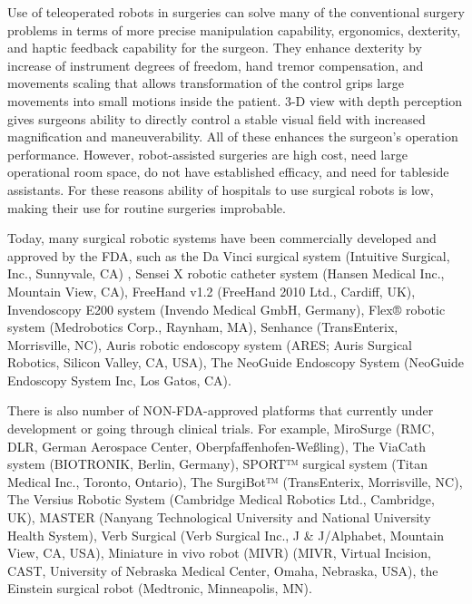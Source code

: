 Use of teleoperated robots in surgeries can solve many of the conventional surgery problems in terms of more precise manipulation capability, ergonomics, dexterity, and haptic feedback capability for the surgeon. They enhance dexterity by increase of instrument degrees of freedom, hand tremor compensation, and movements scaling that allows transformation of the control grips large movements into small motions inside the patient. 3-D view with depth perception gives surgeons ability to directly control a stable visual field with increased magnification and maneuverability. All of these enhances the surgeon's operation performance. However, robot-assisted surgeries are high cost, need large operational room space, do not have established efficacy, and need for tableside assistants. For these reasons ability of hospitals to use surgical robots is low, making their use for routine surgeries improbable. \cite{tavakoli_haptics_2008}

Today, many surgical robotic systems have been commercially developed and approved by the FDA, such as the Da Vinci surgical system (Intuitive Surgical, Inc., Sunnyvale, CA) , Sensei X robotic catheter system (Hansen Medical Inc., Mountain View, CA), FreeHand v1.2 (FreeHand 2010 Ltd., Cardiff, UK), Invendoscopy E200 system (Invendo Medical GmbH, Germany), Flex® robotic system (Medrobotics Corp., Raynham, MA), Senhance (TransEnterix, Morrisville, NC), Auris robotic endoscopy system (ARES; Auris Surgical Robotics, Silicon Valley, CA, USA), The NeoGuide Endoscopy System (NeoGuide Endoscopy System Inc, Los Gatos, CA). \cite{lanfranco_robotic_2004,peters_review_2018} 

There is also number of NON-FDA-approved platforms that currently under development or going through clinical trials. For example, MiroSurge (RMC, DLR, German Aerospace Center, Oberpfaffenhofen-Weßling), The ViaCath system (BIOTRONIK, Berlin, Germany), SPORT™ surgical system (Titan Medical Inc., Toronto, Ontario), The SurgiBot™ (TransEnterix, Morrisville, NC), The Versius Robotic System (Cambridge Medical Robotics Ltd., Cambridge, UK), MASTER (Nanyang Technological University and National University Health System), Verb Surgical (Verb Surgical Inc., J \& J/Alphabet, Mountain View, CA, USA), Miniature in vivo robot (MIVR) (MIVR, Virtual Incision, CAST, University of Nebraska Medical Center, Omaha, Nebraska, USA), the Einstein surgical robot (Medtronic, Minneapolis, MN). \cite{peters_review_2018}

